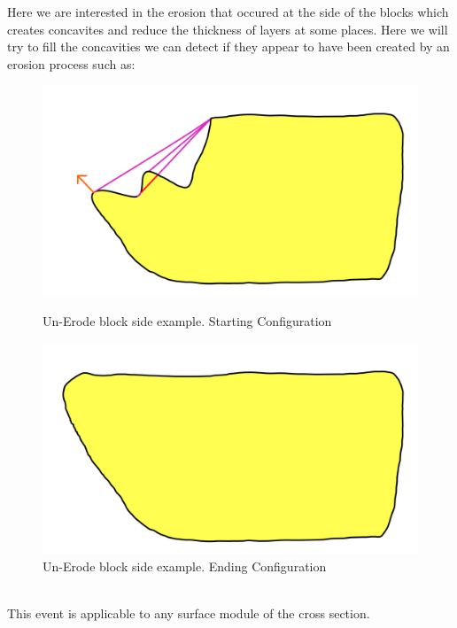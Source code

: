 \documentclass[12pt, a4paper]{memoir} %
\begin{document}
Here we are interested in the erosion that occured at the side of the blocks which creates concavites and reduce the thickness of layers at some places. Here we will try to fill the concavities we can detect if they appear to have been created by an erosion process such as:
\begin{figure}[h]
    \begin{minipage}[c]{.46\linewidth}
        \centering
        \includegraphics[scale=0.2]{unErodeSideDescription0.png}
	\caption{Un-Erode block side example. Starting Configuration}
    \end{minipage}
    \hfill%
    \begin{minipage}[c]{.46\linewidth}
        \centering
        \includegraphics[scale=0.2]{unErodeSideDescription1.png}
	\caption{Un-Erode block side example. Ending Configuration}
    \end{minipage}
\end{figure}\\
This event is applicable to any surface module of the cross section.\\\\
\end{document}

